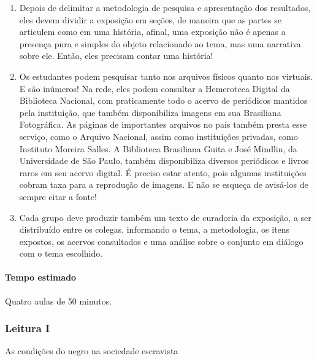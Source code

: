 \documentclass[12pt]{extarticle}
\begin{document}
\begin{enumerate}
\item
Depois de delimitar a metodologia de pesquisa e apresentação dos
resultados, eles devem dividir a exposição em seções, de maneira que as
partes se articulem como em uma história, afinal, uma exposição não é
apenas a presença pura e simples do objeto relacionado ao tema, mas uma
narrativa sobre ele. Então, eles precisam contar uma história!

\item
Os estudantes podem pesquisar tanto nos arquivos físicos quanto nos
virtuais. E são inúmeros! Na rede, eles podem consultar a Hemeroteca
Digital da Biblioteca Nacional, com praticamente todo o acervo de
periódicos mantidos pela instituição, que também disponibiliza imagens
em sua Brasiliana Fotográfica. As páginas de importantes arquivos no
país também presta esse serviço, como o Arquivo Nacional, assim como
instituições privadas, como Instituto Moreira Salles. A Biblioteca
Brasiliana Guita e José Mindlin, da Universidade de São Paulo, também
disponibiliza diversos periódicos e livros raros em seu acervo digital.
É preciso estar atento, pois algumas instituições cobram taxa para a reprodução
de imagens. E não se esqueça de avisá-los de sempre citar a fonte!

\item
Cada grupo deve produzir também um texto de curadoria da exposição, a
ser distribuído entre os colegas, informando o tema, a metodologia, os
itens expostos, os acervos consultados e uma análise sobre o conjunto em
diálogo com o tema escolhido.
\end{enumerate}

\paragraph{Tempo estimado} Quatro aulas de 50 minutos.



\subsubsection{Leitura I} As condições do negro na sociedade escravista


\end{document}
